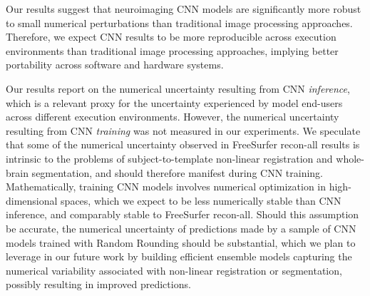 Our results suggest that neuroimaging CNN models are significantly more robust to small numerical perturbations than traditional image processing approaches. Therefore, we expect CNN results to be more reproducible across execution environments than traditional image processing approaches, implying better portability across software and hardware systems. 

Our results report on the numerical uncertainty resulting from CNN \emph{inference}, which is a relevant proxy for the uncertainty experienced by model end-users across different execution environments. However, the numerical uncertainty resulting from CNN \emph{training} was not measured in our experiments. We speculate that some of the numerical uncertainty observed in FreeSurfer recon-all results is intrinsic to the problems of subject-to-template non-linear registration and whole-brain segmentation, and should therefore manifest during CNN training. Mathematically, training CNN models involves numerical optimization in high-dimensional spaces, which we expect to be less numerically stable than CNN inference, and comparably stable to FreeSurfer recon-all. Should this assumption be accurate, the numerical uncertainty of predictions made by a sample of CNN models trained with Random Rounding should be substantial, which we plan to leverage in our future work by building efficient ensemble models capturing the numerical variability associated with non-linear registration or segmentation, possibly resulting in improved predictions. 

